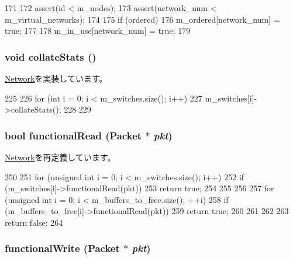 \begin{DoxyCode}
171 {
172     assert(id < m_nodes);
173     assert(network_num < m_virtual_networks);
174 
175     if (ordered) {
176         m_ordered[network_num] = true;
177     }
178     m_in_use[network_num] = true;
179 }
\end{DoxyCode}
\hypertarget{classSimpleNetwork_a208669cbc0bb1d52565956ca8c690c55}{
\subsubsection[{collateStats}]{\setlength{\rightskip}{0pt plus 5cm}void collateStats ()}}
\label{classSimpleNetwork_a208669cbc0bb1d52565956ca8c690c55}


\hyperlink{classNetwork_ab6b1b00ea63b4d41ec52e154052d47ee}{Network}を実装しています。


\begin{DoxyCode}
225 {
226     for (int i = 0; i < m_switches.size(); i++) {
227         m_switches[i]->collateStats();
228     }
229 }
\end{DoxyCode}
\hypertarget{classSimpleNetwork_a729f57f557bb42c045c47d9388f1030e}{
\subsubsection[{functionalRead}]{\setlength{\rightskip}{0pt plus 5cm}bool functionalRead ({\bf Packet} $\ast$ {\em pkt})}}
\label{classSimpleNetwork_a729f57f557bb42c045c47d9388f1030e}


\hyperlink{classNetwork_a32ecdf2d815f1224a090f1d2b27b2c00}{Network}を再定義しています。


\begin{DoxyCode}
250 {
251     for (unsigned int i = 0; i < m_switches.size(); i++) {
252         if (m_switches[i]->functionalRead(pkt)) {
253             return true;
254         }
255     }
256 
257     for (unsigned int i = 0; i < m_buffers_to_free.size(); ++i) {
258         if (m_buffers_to_free[i]->functionalRead(pkt)) {
259             return true;
260         }
261     }
262 
263     return false;
264 }
\end{DoxyCode}
\hypertarget{classSimpleNetwork_ad07b9def1d6f5e5f988a254c3a9d1ad9}{
\subsubsection[{functionalWrite}]{ functionalWrite ({\bf Packet} $\ast$ {\em pkt})}}
\label{classSimpleNetwork_ad07b9def1d6f5e5f988a254c3a9d1ad9}


